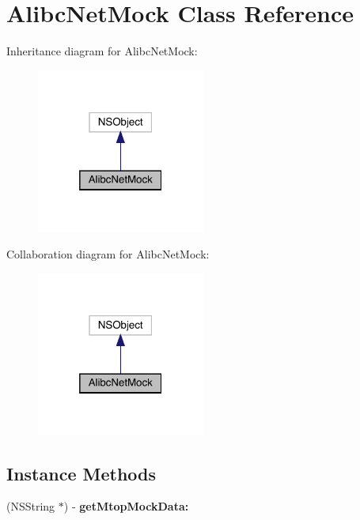 \hypertarget{interface_alibc_net_mock}{}\section{Alibc\+Net\+Mock Class Reference}
\label{interface_alibc_net_mock}


Inheritance diagram for Alibc\+Net\+Mock\+:\nopagebreak
\begin{figure}[H]
\begin{center}
\leavevmode
\includegraphics[width=157pt]{interface_alibc_net_mock__inherit__graph}
\end{center}
\end{figure}


Collaboration diagram for Alibc\+Net\+Mock\+:\nopagebreak
\begin{figure}[H]
\begin{center}
\leavevmode
\includegraphics[width=157pt]{interface_alibc_net_mock__coll__graph}
\end{center}
\end{figure}
\subsection*{Instance Methods}
\begin{DoxyCompactItemize}
\item 
\mbox{\label{interface_alibc_net_mock_af5cd73613f8579a297361f60900a2c39}} 
(N\+S\+String $\ast$) -\/ {\bfseries get\+Mtop\+Mock\+Data\+:}
\end{DoxyCompactItemize}
